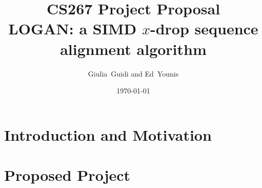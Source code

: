\documentclass[11pt,onecolumn]{article}
\title{CS267 Project Proposal \\ LOGAN: a SIMD $x$-drop sequence alignment algorithm
}
\author{Giulia~Guidi and Ed~Younis}
\date{
\today\\
}
\begin{document}
\maketitle
\section*{Introduction and Motivation}

\section*{Proposed Project}



\end{document}
